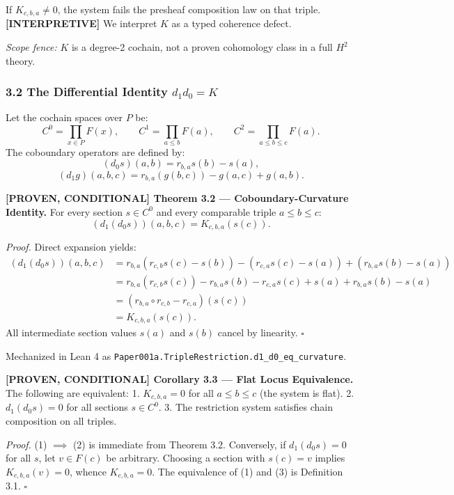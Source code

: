 \documentclass[
  english,
  10pt,
  a4paper,
]{article}
\renewenvironment{quote}
  {\begin{leftbar}\small}
  {\end{leftbar}}
\begin{document}
If \(K_{c,b,a}\ne 0\), the system fails the presheaf composition law on
that triple. \textbf{{[}INTERPRETIVE{]}} We interpret \(K\) as a typed
coherence defect.

\emph{Scope fence:} \(K\) is a degree-2 cochain, not a proven cohomology
class in a full \(H^2\) theory.

\subsubsection{\texorpdfstring{3.2 The Differential Identity
\(d_1 d_0 = K\)}{3.2 The Differential Identity d\_1 d\_0 = K}}\label{the-differential-identity-d_1-d_0-k}

Let the cochain spaces over \(P\) be: \[
C^0 = \prod_{x\in P} F(x),\qquad
C^1 = \prod_{a\le b} F(a),\qquad
C^2 = \prod_{a\le b\le c} F(a).
\] The coboundary operators are defined by: \[
(d_0 s)(a,b) = r_{b,a}s(b) - s(a),
\] \[
(d_1 g)(a,b,c) = r_{b,a}(g(b,c)) - g(a,c) + g(a,b).
\]

\begin{quote}
\textbf{{[}PROVEN, CONDITIONAL{]} Theorem 3.2 --- Coboundary-Curvature
Identity.} For every section \(s\in C^0\) and every comparable triple
\(a\le b\le c\): \[
(d_1(d_0 s))(a,b,c) = K_{c,b,a}(s(c)).
\]

\emph{Proof.} Direct expansion yields: \[
\begin{aligned}
(d_1(d_0 s))(a,b,c)
&= r_{b,a}(r_{c,b}s(c) - s(b)) - (r_{c,a}s(c) - s(a)) + (r_{b,a}s(b) - s(a)) \\
&= r_{b,a}(r_{c,b}s(c)) - r_{b,a}s(b) - r_{c,a}s(c) + s(a) + r_{b,a}s(b) - s(a) \\
&= (r_{b,a}\circ r_{c,b} - r_{c,a})(s(c)) \\
&= K_{c,b,a}(s(c)).
\end{aligned}
\] All intermediate section values \(s(a)\) and \(s(b)\) cancel by
linearity. \(\square\)
\end{quote}

Mechanized in Lean 4 as
\nolinkurl{Paper001a.TripleRestriction.d1_d0_eq_curvature}.

\begin{quote}
\textbf{{[}PROVEN, CONDITIONAL{]} Corollary 3.3 --- Flat Locus
Equivalence.} The following are equivalent: 1. \(K_{c,b,a}=0\) for all
\(a\le b\le c\) (the system is flat). 2. \(d_1(d_0 s)=0\) for all
sections \(s\in C^0\). 3. The restriction system satisfies chain
composition on all triples.

\emph{Proof.} (1) \(\implies\) (2) is immediate from Theorem 3.2.
Conversely, if \(d_1(d_0 s)=0\) for all \(s\), let \(v\in F(c)\) be
arbitrary. Choosing a section with \(s(c)=v\) implies
\(K_{c,b,a}(v)=0\), whence \(K_{c,b,a}=0\). The equivalence of (1) and
(3) is Definition 3.1. \(\square\)
\end{quote}
\end{document}
